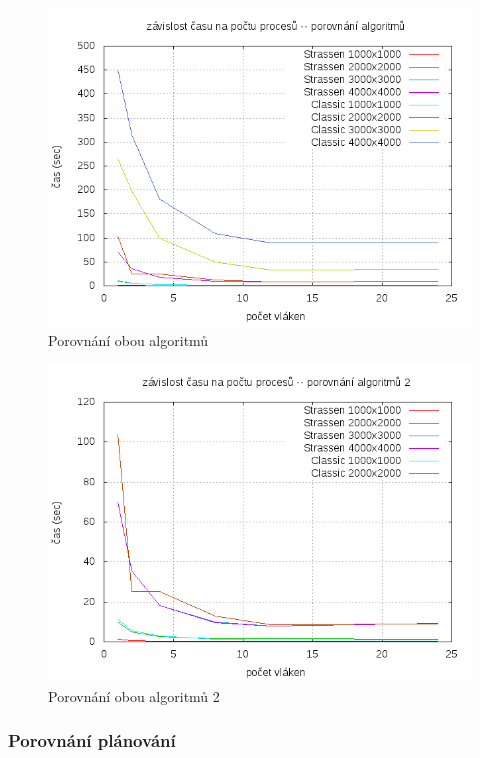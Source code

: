 \documentclass[12pt,a4paper]{article}
\begin{document}
\begin{figure}[h]
\includegraphics[width=\textwidth]{graph/classic-vs-strassen.png}
\caption{Porovnání obou algoritmů}
\label{data4}
\end{figure}

\pagebreak
\begin{figure}[h]
\includegraphics[width=\textwidth]{graph/classic-vs-strassen-2.png}
\caption{Porovnání obou algoritmů 2}
\label{data4}
\end{figure}

\pagebreak
\subsubsection{Porovnání plánování}
\end{document}

